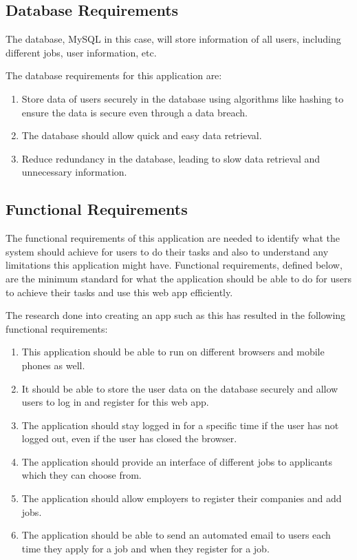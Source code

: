 \subsection{Database Requirements}
The database, MySQL in this case, will store information of all users, including different jobs, user information, etc. 

The database requirements for this application are:
\begin{enumerate}
    \item Store data of users securely in the database using algorithms like hashing to ensure the data is secure even through a data breach. \parencite{Reference29}
    \item The database should allow quick and easy data retrieval.
    \item Reduce redundancy in the database, leading to slow data retrieval and unnecessary information.
\end{enumerate}

\subsection{Functional Requirements}
The functional requirements of this application are needed to identify what the system should achieve for users to do their tasks and also to understand any limitations this application might have. Functional requirements, defined below, are the minimum standard for what the application should be able to do for users to achieve their tasks and use this web app efficiently.

The research done into creating an app such as this has resulted in the following functional requirements:
\begin{enumerate}
    \item This application should be able to run on different browsers and mobile phones as well.
    \item It should be able to store the user data on the database securely and allow users to log in and register for this web app.
    \item The application should stay logged in for a specific time if the user has not logged out, even if the user has closed the browser.
    \item The application should provide an interface of different jobs to applicants which they can choose from.
    \item The application should allow employers to register their companies and add jobs.
    \item The application should be able to send an automated email to users each time they apply for a job and when they register for a job. 
\end{enumerate}

